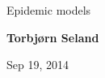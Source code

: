 \documentclass[%
twoside,                 %
final,                   %
10pt]{article}
\begin{document}






\thispagestyle{empty}

\begin{center}
{\LARGE\bf
\begin{spacing}{1.25}
Epidemic models
\end{spacing}
}
\end{center}


\begin{center}
{\bf Torbjørn Seland${}^{}$} \\ [0mm]
\end{center}

    \begin{center}
\end{center}


\begin{center}
Sep 19, 2014
\end{center}

\vspace{1cm}


\tableofcontents


\vspace{1cm} %
\end{document}
